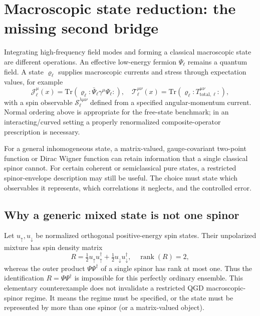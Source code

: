\documentclass[11pt,a4paper]{article}
\newcommand{\TT}{\mathcal T}
\newcommand{\JJ}{\mathcal J}
\newcommand{\Spin}{\mathcal S}
\begin{document}
\section{Macroscopic state reduction: the missing second bridge}\label{sec:state}
Integrating high-frequency field modes and forming a classical macroscopic state are different operations. An effective low-energy fermion $\Psi_\ell$ remains a quantum field. A state $\varrho_\ell$ supplies macroscopic currents and stress through expectation values, for example
\begin{equation}\label{eq:macroobs}
\JJ^\mu_\ell(x)=\mathrm{Tr}(\varrho_\ell:\!\bar\Psi_\ell\gamma^\mu\Psi_\ell\!:),\quad
\TT^{\mu\nu}_\ell(x)=\mathrm{Tr}(\varrho_\ell:\!T_{\mathrm{total},\ell}^{\mu\nu}\!:),
\end{equation}
with a spin observable $\Spin^{\lambda\mu\nu}_\ell$ defined from a specified angular-momentum current. Normal ordering above is appropriate for the free-state benchmark; in an interacting/curved setting a properly renormalized composite-operator prescription is necessary.

For a general inhomogeneous state, a matrix-valued, gauge-covariant two-point function or Dirac Wigner function can retain information that a single classical spinor cannot. For certain coherent or semiclassical pure states, a restricted spinor-envelope description may still be useful. The choice must state which observables it represents, which correlations it neglects, and the controlled error.

\subsection{Why a generic mixed state is not one spinor}
Let $u_\uparrow,u_\downarrow$ be normalized orthogonal positive-energy spin states. Their unpolarized mixture has spin density matrix
\begin{equation}\label{eq:rank}
R=\tfrac12u_\uparrow u_\uparrow^\dagger+\tfrac12u_\downarrow u_\downarrow^\dagger,
\quad \operatorname{rank}(R)=2,
\end{equation}
whereas the outer product $\Psi\Psi^\dagger$ of a single spinor has rank at most one. Thus the identification $R=\Psi\Psi^\dagger$ is impossible for this perfectly ordinary ensemble. This elementary counterexample does not invalidate a restricted QGD macroscopic-spinor regime. It means the regime must be specified, or the state must be represented by more than one spinor (or a matrix-valued object).
\end{document}
